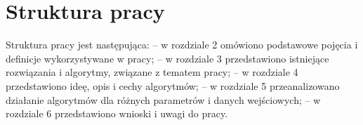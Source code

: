 \section{Struktura pracy}
\label{c14}   
Struktura pracy jest następująca:\newline
-- w rozdziale 2 omówiono podstawowe pojęcia i definicje wykorzystywane w pracy;\newline
-- w rozdziale 3 przedstawiono istniejące rozwiązania i algorytmy, związane z tematem pracy;\newline
-- w rozdziale 4 przedstawiono ideę, opis i cechy algorytmów;\newline
-- w rozdziale 5 przeanalizowano działanie algorytmów dla różnych parametrów i danych wejściowych;\newline
-- w rozdziale 6 przedstawiono wnioski i uwagi do pracy.